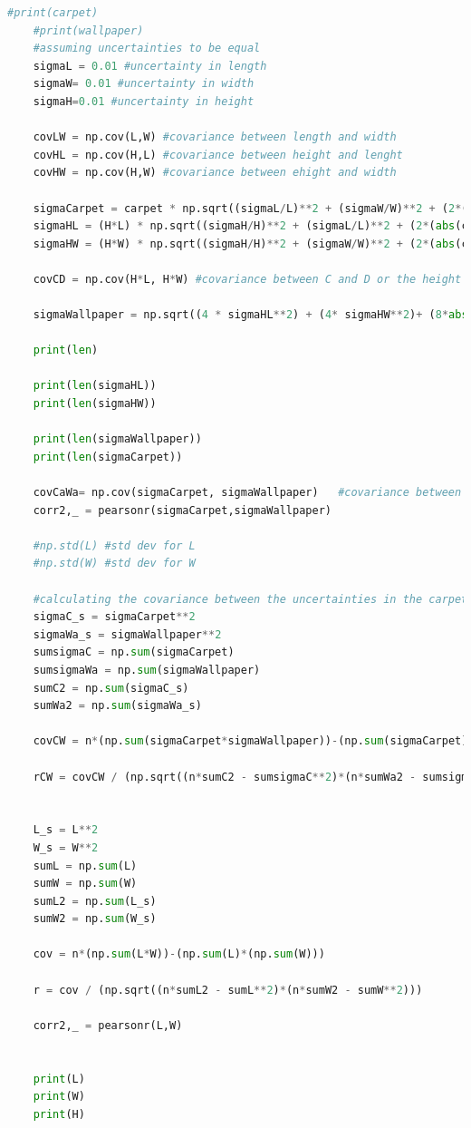 \documentclass[12pt]{article}
\begin{document}
\begin{enumerate}
\begin{enumerate}
{\begin{lstlisting}[language=Python]
    #print(carpet)
    #print(wallpaper)
    #assuming uncertainties to be equal
    sigmaL = 0.01 #uncertainty in length
    sigmaW= 0.01 #uncertainty in width
    sigmaH=0.01 #uncertainty in height
    
    covLW = np.cov(L,W) #covariance between length and width
    covHL = np.cov(H,L) #covariance between height and lenght
    covHW = np.cov(H,W) #covariance between ehight and width
    
    sigmaCarpet = carpet * np.sqrt((sigmaL/L)**2 + (sigmaW/W)**2 + (2*(abs(covLW[0][1]/(L*W))))) #uncertainty in amount of carpet needed
    sigmaHL = (H*L) * np.sqrt((sigmaH/H)**2 + (sigmaL/L)**2 + (2*(abs(covHL[0][1]/(H*L))))) #uncertainty in H*L C in notes
    sigmaHW = (H*W) * np.sqrt((sigmaH/H)**2 + (sigmaW/W)**2 + (2*(abs(covHW[0][1]/(H*W))))) #uncertainty in H*W D in notes
    
    covCD = np.cov(H*L, H*W) #covariance between C and D or the height length and height width
    
    sigmaWallpaper = np.sqrt((4 * sigmaHL**2) + (4* sigmaHW**2)+ (8*abs(covCD[0][1]))) #uncertainty in wallpaper
    
    print(len)
    
    print(len(sigmaHL))
    print(len(sigmaHW))
    
    print(len(sigmaWallpaper))
    print(len(sigmaCarpet))
    
    covCaWa= np.cov(sigmaCarpet, sigmaWallpaper)   #covariance between carpet and wallpaper uncertainties
    corr2,_ = pearsonr(sigmaCarpet,sigmaWallpaper)
    
    #np.std(L) #std dev for L
    #np.std(W) #std dev for W
    
    #calculating the covariance between the uncertainties in the carpet and wallpaper
    sigmaC_s = sigmaCarpet**2
    sigmaWa_s = sigmaWallpaper**2
    sumsigmaC = np.sum(sigmaCarpet)
    sumsigmaWa = np.sum(sigmaWallpaper)
    sumC2 = np.sum(sigmaC_s)
    sumWa2 = np.sum(sigmaWa_s)
    
    covCW = n*(np.sum(sigmaCarpet*sigmaWallpaper))-(np.sum(sigmaCarpet)*(np.sum(sigmaWallpaper)))
    
    rCW = covCW / (np.sqrt((n*sumC2 - sumsigmaC**2)*(n*sumWa2 - sumsigmaWa**2)))
    
    
    L_s = L**2
    W_s = W**2
    sumL = np.sum(L)
    sumW = np.sum(W)
    sumL2 = np.sum(L_s)
    sumW2 = np.sum(W_s)
    
    cov = n*(np.sum(L*W))-(np.sum(L)*(np.sum(W)))
    
    r = cov / (np.sqrt((n*sumL2 - sumL**2)*(n*sumW2 - sumW**2)))
    
    corr2,_ = pearsonr(L,W)
    
                             
    print(L)
    print(W)
    print(H)
\end{lstlisting}

    }
\end{enumerate}

\end{enumerate}
\end{document}
